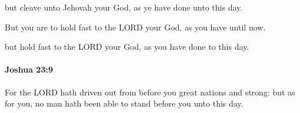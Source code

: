 			\begin{versebox}
					\item[BHS] 
					\item[ASV] but cleave unto Jehovah your God, as ye have done unto this day.
					\item[NIV] But you are to hold fast to the LORD your God, as you have until now.
					\item[NRSV] but hold fast to the LORD your God, as you have done to this day.
			\end{versebox}

		\paragraph{Joshua 23:9} %
			\label{JOSHUA-23-9}

			For the LORD hath driven out from before you great nations and strong: but as for you, no man hath been able to stand before you unto this day.

